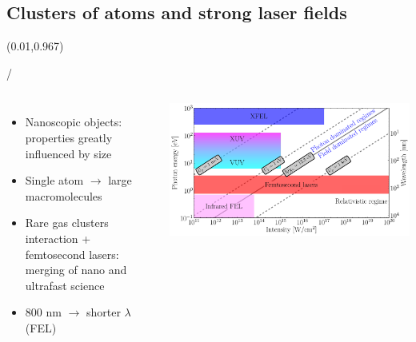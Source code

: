 \documentclass{beamer}
\makeatletter
\newcommand{\framenumber}{
\begin{textblock}{0}(0.01,0.967)
\begin{scriptsize}
{\color{gray}\insertframenumber/\inserttotalframenumber}
\end{scriptsize}
\end{textblock}
}
\makeatother
\begin{document}
\subsection{Clusters of atoms and strong laser fields}
\begin{frame}{}\framenumber
	\begin{columns}
		\begin{itemize}
		\item Nanoscopic objects: properties greatly influenced by size
		\item Single atom $\rightarrow$ large macromolecules
		\item Rare gas clusters interaction + femtosecond lasers: merging of nano and ultrafast science
		\item 800 nm $\rightarrow$ shorter $\lambda$ (FEL)
		\end{itemize}
		\includegraphics[width=1.1\textwidth]{../figures/regimes}

\end{columns}
\end{frame}
\end{document}

